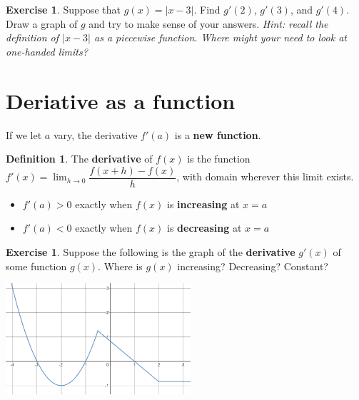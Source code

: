 \documentclass[11pt,reqno,final]{amsart}
\numberwithin{figure}{section}
\theoremstyle{definition} %
\newtheorem{definition}[equation]{Definition}%
\newtheorem{exercise}[question]{Exercise}
\newcommand{\dlim}{\displaystyle\lim}
\begin{document}
\newpage
\restoregeometry

\begin{exercise}
        Suppose that $g(x) = |x-3|$. Find $g'(2)$, $g'(3)$, and $g'(4)$.
        Draw a graph of $g$ and try to make sense of your answers.
        \textit{Hint: recall the definition of $|x-3|$ as a piecewise function. Where might your need to look at one-handed limits?}
        \vfill
\end{exercise}

\setcounter{section}{1}
\section{Deriative as a function}

If we let $a$ vary, the derivative $f'(a)$ is a \textbf{new function}.
\begin{definition}
        The \textbf{derivative} of $f(x)$ is the function $f'(x) = \dlim_{h \to 0}\dfrac{f(x+h) - f(x)}{h}$,
        with domain wherever this limit exists.
\end{definition}

\begin{framed}
        \begin{itemize}
        \item $f'(a) > 0$ exactly when $f(x)$ is \textbf{increasing} at $x=a$
        \item $f'(a) < 0$ exactly when $f(x)$ is \textbf{decreasing} at $x=a$
        \end{itemize}
\end{framed}

\begin{exercise}
        Suppose the following is the graph of the \textbf{derivative} $g'(x)$ of some function $g(x)$.
        Where is $g(x)$ increasing? Decreasing? Constant?
        
        \includegraphics[width=2.7in]{10-07P_fprime.png}
\end{exercise}
\end{document}
